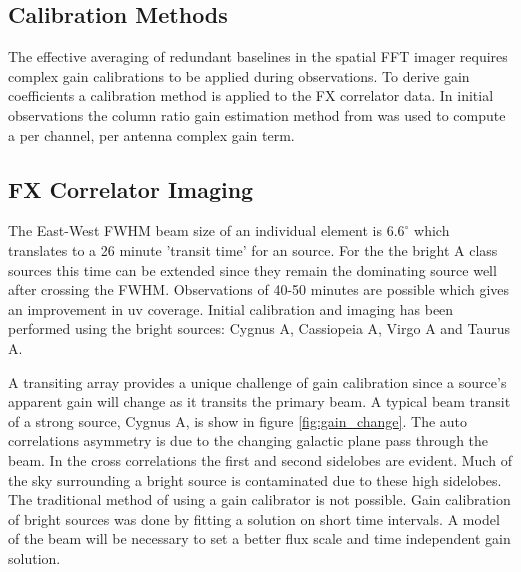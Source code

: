 \documentclass[useAMS,macros,usenatbib,onecolumn]{mn2e}
\begin{document}
\subsection{Calibration Methods}
\label{calibration}

The effective averaging of redundant baselines in the spatial FFT imager requires complex gain calibrations to be applied during observations.
To derive gain coefficients a calibration method is applied to the FX correlator data.
In initial observations the column ratio gain estimation method from \citep{gaindecomp} was used to compute a per channel, per antenna complex gain term.

\subsection{FX Correlator Imaging}
\label{fx results}

The East-West FWHM beam size of an individual element is $6.6^{\circ}$ which translates to a 26 minute 'transit time' for an source.
For the the bright A class sources this time can be extended since they remain the dominating source well after crossing the FWHM.
Observations of 40-50 minutes are possible which gives an improvement in uv coverage. 
Initial calibration and imaging has been performed using the bright sources: Cygnus A, Cassiopeia A, Virgo A and Taurus A.

A transiting array provides a unique challenge of gain calibration since a source's apparent gain will change as it transits the primary beam.
A typical beam transit of a strong source, Cygnus A, is show in figure \ref{fig:gain_change}.
The auto correlations asymmetry is due to the changing galactic plane pass through the beam.
In the cross correlations the first and second sidelobes are evident.
Much of the sky surrounding a bright source is contaminated due to these high sidelobes.
The traditional method of using a gain calibrator is not possible.
Gain calibration of bright sources was done by fitting a solution on short time intervals.
A model of the beam will be necessary to set a better flux scale and time independent gain solution.
\end{document}
